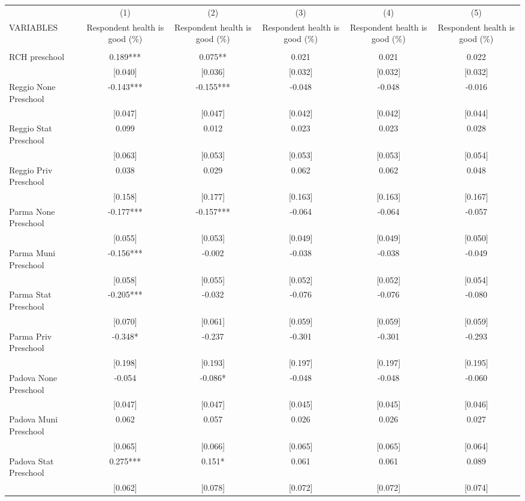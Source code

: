 \begin{tabular}{lccccc} \hline
 & (1) & (2) & (3) & (4) & (5) \\
VARIABLES & Respondent health is good (\%) & Respondent health is good (\%) & Respondent health is good (\%) & Respondent health is good (\%) & Respondent health is good (\%) \\ \hline
 &  &  &  &  &  \\
RCH preschool & 0.189*** & 0.075** & 0.021 & 0.021 & 0.022 \\
 & [0.040] & [0.036] & [0.032] & [0.032] & [0.032] \\
Reggio None Preschool & -0.143*** & -0.155*** & -0.048 & -0.048 & -0.016 \\
 & [0.047] & [0.047] & [0.042] & [0.042] & [0.044] \\
Reggio Stat Preschool & 0.099 & 0.012 & 0.023 & 0.023 & 0.028 \\
 & [0.063] & [0.053] & [0.053] & [0.053] & [0.054] \\
Reggio Priv Preschool & 0.038 & 0.029 & 0.062 & 0.062 & 0.048 \\
 & [0.158] & [0.177] & [0.163] & [0.163] & [0.167] \\
Parma None Preschool & -0.177*** & -0.157*** & -0.064 & -0.064 & -0.057 \\
 & [0.055] & [0.053] & [0.049] & [0.049] & [0.050] \\
Parma Muni Preschool & -0.156*** & -0.002 & -0.038 & -0.038 & -0.049 \\
 & [0.058] & [0.055] & [0.052] & [0.052] & [0.054] \\
Parma Stat Preschool & -0.205*** & -0.032 & -0.076 & -0.076 & -0.080 \\
 & [0.070] & [0.061] & [0.059] & [0.059] & [0.059] \\
Parma Priv Preschool & -0.348* & -0.237 & -0.301 & -0.301 & -0.293 \\
 & [0.198] & [0.193] & [0.197] & [0.197] & [0.195] \\
Padova None Preschool & -0.054 & -0.086* & -0.048 & -0.048 & -0.060 \\
 & [0.047] & [0.047] & [0.045] & [0.045] & [0.046] \\
Padova Muni Preschool & 0.062 & 0.057 & 0.026 & 0.026 & 0.027 \\
 & [0.065] & [0.066] & [0.065] & [0.065] & [0.064] \\
Padova Stat Preschool & 0.275*** & 0.151* & 0.061 & 0.061 & 0.089 \\
 & [0.062] & [0.078] & [0.072] & [0.072] & [0.074] \\

\end{tabular}
